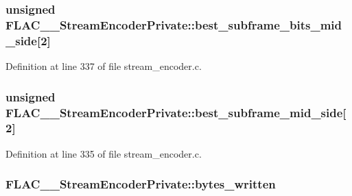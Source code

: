 \subsubsection[{\texorpdfstring{best\+\_\+subframe\+\_\+bits\+\_\+mid\+\_\+side}{best_subframe_bits_mid_side}}]{\setlength{\rightskip}{0pt plus 5cm}unsigned F\+L\+A\+C\+\_\+\+\_\+\+Stream\+Encoder\+Private\+::best\+\_\+subframe\+\_\+bits\+\_\+mid\+\_\+side\mbox{[}2\mbox{]}}\hypertarget{struct_f_l_a_c_____stream_encoder_private_a485bad41f46981b778caaa081d71bc6c}{}\label{struct_f_l_a_c_____stream_encoder_private_a485bad41f46981b778caaa081d71bc6c}


Definition at line 337 of file stream\+\_\+encoder.\+c.

\subsubsection[{\texorpdfstring{best\+\_\+subframe\+\_\+mid\+\_\+side}{best_subframe_mid_side}}]{\setlength{\rightskip}{0pt plus 5cm}unsigned F\+L\+A\+C\+\_\+\+\_\+\+Stream\+Encoder\+Private\+::best\+\_\+subframe\+\_\+mid\+\_\+side\mbox{[}2\mbox{]}}\hypertarget{struct_f_l_a_c_____stream_encoder_private_a35209fa9cccf2b38fcd88c3af299b846}{}\label{struct_f_l_a_c_____stream_encoder_private_a35209fa9cccf2b38fcd88c3af299b846}


Definition at line 335 of file stream\+\_\+encoder.\+c.

\subsubsection[{\texorpdfstring{bytes\+\_\+written}{bytes_written}}]{ F\+L\+A\+C\+\_\+\+\_\+\+Stream\+Encoder\+Private\+::bytes\+\_\+written}\hypertarget{struct_f_l_a_c_____stream_encoder_private_ad88bd11f9cf2805bdd5388f61352e4ca}{}\label{struct_f_l_a_c_____stream_encoder_private_ad88bd11f9cf2805bdd5388f61352e4ca}


